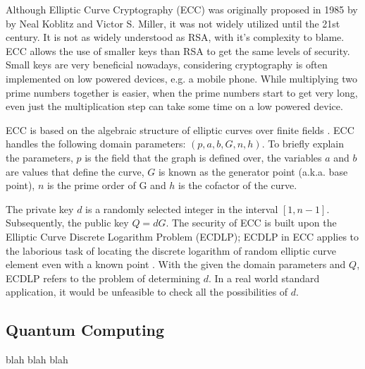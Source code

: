 Although Elliptic Curve Cryptography (ECC) was originally proposed in 1985 by by Neal Koblitz and Victor S. Miller, it was not widely utilized until the 21st century. It is not as widely understood as RSA, with it's complexity to blame. ECC allows the use of smaller keys than RSA to get the same levels of security. Small keys are very beneficial nowadays, considering cryptography is often implemented on low powered devices, e.g. a mobile phone. While multiplying two prime numbers together is easier, when the prime numbers start to get very long, even just the multiplication step can take some time on a low powered device.

ECC is based on the algebraic structure of elliptic curves over finite fields \cite{RSA_ECC}. ECC handles the following domain parameters: \((p,a,b,G,n,h)\). To briefly explain the parameters, \(p\) is the field that the graph is defined over, the variables \(a\) and \(b\) are values that define the curve, \(G\) is known as the generator point (a.k.a. base point), \(n\) is the prime order of G and \(h\) is the cofactor of the curve.

The private key \(d\) is a randomly selected integer in the interval \( [ 1 , n - 1 ]\). Subsequently, the public key \(Q=dG\). The security of ECC is built upon the Elliptic Curve Discrete Logarithm Problem (ECDLP); ECDLP in ECC applies to the laborious task of locating the discrete logarithm of random elliptic curve element even with a known point \cite{secrisk}. With the given the domain parameters and \(Q\), ECDLP refers to the problem of determining \(d\). In a real world standard application, it would be unfeasible to check all the possibilities of \(d\).

\subsection{Quantum Computing}
blah blah blah